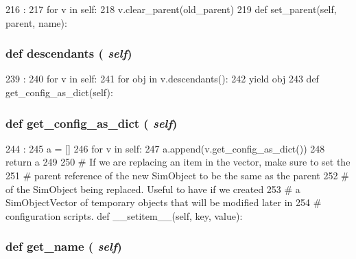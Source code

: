\begin{DoxyCode}
216                                       :
217         for v in self:
218             v.clear_parent(old_parent)
219 
    def set_parent(self, parent, name):
\end{DoxyCode}
\hypertarget{classm5_1_1params_1_1SimObjectVector_acf2e57325b000a537cce1d359185f734}{
\subsubsection[{descendants}]{\setlength{\rightskip}{0pt plus 5cm}def descendants ( {\em self})}}
\label{classm5_1_1params_1_1SimObjectVector_acf2e57325b000a537cce1d359185f734}



\begin{DoxyCode}
239                          :
240         for v in self:
241             for obj in v.descendants():
242                 yield obj
243 
    def get_config_as_dict(self):
\end{DoxyCode}
\hypertarget{classm5_1_1params_1_1SimObjectVector_ab1772c0da7b9e12819e1c0373513c53c}{
\subsubsection[{get\_\-config\_\-as\_\-dict}]{\setlength{\rightskip}{0pt plus 5cm}def get\_\-config\_\-as\_\-dict ( {\em self})}}
\label{classm5_1_1params_1_1SimObjectVector_ab1772c0da7b9e12819e1c0373513c53c}



\begin{DoxyCode}
244                                 :
245         a = []
246         for v in self:
247             a.append(v.get_config_as_dict())
248         return a
249 
250     # If we are replacing an item in the vector, make sure to set the
251     # parent reference of the new SimObject to be the same as the parent
252     # of the SimObject being replaced. Useful to have if we created
253     # a SimObjectVector of temporary objects that will be modified later in
254     # configuration scripts.
    def __setitem__(self, key, value):
\end{DoxyCode}
\hypertarget{classm5_1_1params_1_1SimObjectVector_a2f3160d6b4e517398ca3f9e51b260bb7}{
\subsubsection[{get\_\-name}]{\setlength{\rightskip}{0pt plus 5cm}def get\_\-name ( {\em self})}}
\label{classm5_1_1params_1_1SimObjectVector_a2f3160d6b4e517398ca3f9e51b260bb7}



